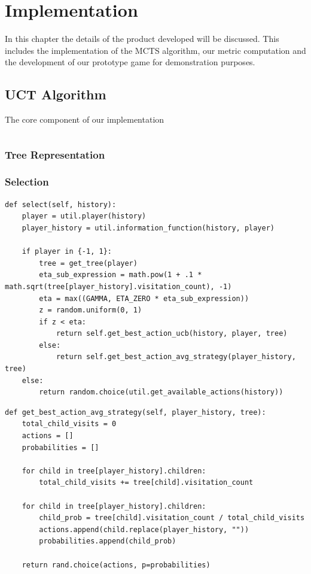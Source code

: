 \chapter{Implementation}\label{ch:development}
In this chapter the details of the product developed will be discussed.
This includes the implementation of the MCTS algorithm, our metric computation and
the development of our prototype game for demonstration purposes.


\section{UCT Algorithm}\label{sec:MCTS}
The core component of our implementation
\begin{lstlisting}[style=Python]

\end{lstlisting}

\subsection{Tree Representation}\label{subsec:treeRepresentation}

\subsection{Selection}\label{subsec:selection}

\begin{lstlisting}[style=Python]
def select(self, history):
    player = util.player(history)
    player_history = util.information_function(history, player)

    if player in {-1, 1}:
        tree = get_tree(player)
        eta_sub_expression = math.pow(1 + .1 * math.sqrt(tree[player_history].visitation_count), -1)
        eta = max((GAMMA, ETA_ZERO * eta_sub_expression))
        z = random.uniform(0, 1)
        if z < eta:
            return self.get_best_action_ucb(history, player, tree)
        else:
            return self.get_best_action_avg_strategy(player_history, tree)
    else:
        return random.choice(util.get_available_actions(history))
\end{lstlisting}


\begin{lstlisting}[style=Python]
def get_best_action_avg_strategy(self, player_history, tree):
    total_child_visits = 0
    actions = []
    probabilities = []

    for child in tree[player_history].children:
        total_child_visits += tree[child].visitation_count

    for child in tree[player_history].children:
        child_prob = tree[child].visitation_count / total_child_visits
        actions.append(child.replace(player_history, ""))
        probabilities.append(child_prob)

    return rand.choice(actions, p=probabilities)

\end{lstlisting}

